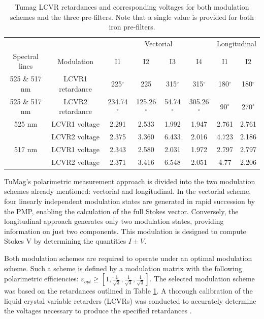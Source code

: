 \begin{table}
    \centering
   \begin{tabular}{cc|cccc|cc}
    \hline
    \hline
     & & \multicolumn{4}{c}{Vectorial} & \multicolumn{2}{|c}{Longitudinal}  \\
     Spectral lines & Modulation & I1 & I2 & I3 & I4 & I1 & I2 \\
    \hline
    525 \& 517 nm & LCVR1 retardance  & 225$^\circ$  & 225 & 315$^\circ$ & 315$^\circ$ & 180$^\circ$  & 180$^\circ$\\
    525 \& 517 nm  & LCVR2 retardance  & 234.74$^\circ$ & 125.26$^\circ$ & 54.74$^\circ$ & 305.26$^\circ$ & 90$^\circ$ & 270$^\circ$ \\
    \hline
    525 nm & LCVR1 voltage & 2.291 & 2.533 & 1.992 & 1.947 & 2.761 & 2.761 \\
     & LCVR2 voltage & 2.375 & 3.360 & 6.433 & 2.016 & 4.723 & 2.186 \\
    \hline
    517 nm & LCVR1 voltage & 2.343 & 2.580 & 2.031 & 1.972 & 2.797 & 2.797\\
     & LCVR2 voltage & 2.371 & 3.416 & 6.548 & 2.051 & 4.77 & 2.206\\
    \hline
    \hline
    \end{tabular}
    \caption{Tumag LCVR retardances and corresponding voltages for both modulation schemes and the three pre-filters. Note that a single value is provided for both iron pre-filters.}
    \label{table: polarimetric configs}
\end{table}

TuMag's polarimetric measurement approach is divided into the two modulation schemes already mentioned: vectorial and longitudinal. In the vectorial scheme, four linearly independent modulation states are generated in rapid succession by the PMP, enabling the calculation of the full Stokes vector. Conversely, the longitudinal approach generates only two modulation states, providing information on just two components. This modulation is designed to compute Stokes V by determining the quantities $I\pm V$.

Both modulation schemes are required to operate under an optimal modulation scheme. Such a scheme is defined by a modulation matrix with the following polarimetric efficiencies: $\varepsilon _{opt} \geqslant [1, \frac{1}{\sqrt{3}}, \frac{1}{\sqrt{3}}, \frac{1}{\sqrt{3}}]$. The selected modulation scheme was based on the retardances outlined in Table \ref{table: polarimetric configs}. A thorough calibration of the liquid crystal variable retarders (LCVRs) was conducted to accurately determine the voltages necessary to produce the specified retardances \citep{fine-tunin}.

